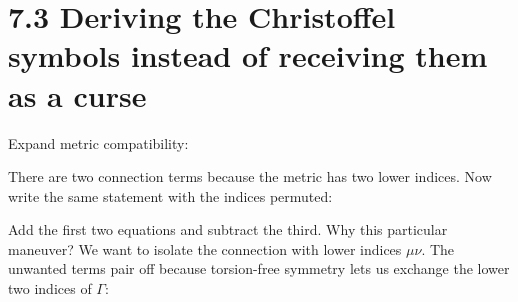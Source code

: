 \documentclass[
  11pt,
  letterpaper,
  oneside,
  openany]{scrbook}
\begin{document}
\hypertarget{deriving-the-christoffel-symbols-instead-of-receiving-them-as-a-curse}{%
\section{7.3 Deriving the Christoffel symbols instead of receiving them
as a
curse}\label{deriving-the-christoffel-symbols-instead-of-receiving-them-as-a-curse}}

Expand metric compatibility:

\begin{center}
\begingroup
{}
\ifdim\wd\grmathbox>\linewidth
\resizebox{\linewidth}{!}{\usebox{\grmathbox}}
\else\usebox{\grmathbox}\fi
\endgroup
\end{center}

There are two connection terms because the metric has two lower indices.
Now write the same statement with the indices permuted:

\begin{center}
\begingroup
{}
\ifdim\wd\grmathbox>\linewidth
\resizebox{\linewidth}{!}{\usebox{\grmathbox}}
\else\usebox{\grmathbox}\fi
\endgroup
\end{center}

Add the first two equations and subtract the third. Why this particular
maneuver? We want to isolate the connection with lower indices
\(\mu\nu\). The unwanted terms pair off because torsion-free symmetry
lets us exchange the lower two indices of \(\Gamma\):

\begin{center}
\begingroup
{}
\ifdim\wd\grmathbox>\linewidth
\resizebox{\linewidth}{!}{\usebox{\grmathbox}}
\else\usebox{\grmathbox}\fi
\endgroup
\end{center}
\end{document}
